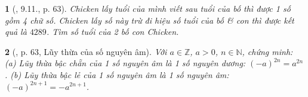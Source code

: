 \documentclass{article}
\newtheorem{baitoan}{}
\begin{document}
\begin{baitoan}[\cite{Binh_boi_duong_Toan_6_tap_1}, 9.11., p. 63]
	Chicken lấy tuổi của mình viết sau tuổi của bố thì được 1 số gồm 4 chữ số. Chicken lấy số này trừ đi hiệu số tuổi của bố \& con thì được kết quả là $4289$. Tìm số tuổi của 2 bố con Chicken.
\end{baitoan}

\begin{baitoan}[\cite{Binh_boi_duong_Toan_6_tap_1}, p. 63, Lũy thừa của số nguyên âm]
	Với $a\in\mathbb{Z}$, $a > 0$, $n\in\mathbb{N}$, chứng minh: (a) Lũy thừa bậc chẵn của 1 số nguyên âm là 1 số nguyên dương: $(-a)^{2n} = a^{2n}$. (b) Lũy thừa bậc lẻ của 1 số nguyên âm là 1 số nguyên âm: $(-a)^{2n + 1} = -a^{2n + 1}$.
\end{baitoan}


\printbibliography[heading=bibintoc]
\end{document}
